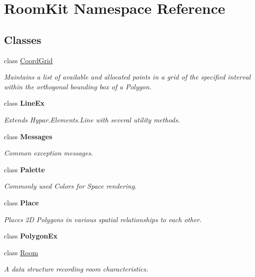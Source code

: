 \hypertarget{namespace_room_kit}{}\section{Room\+Kit Namespace Reference}
\label{namespace_room_kit}
\subsection*{Classes}
\begin{DoxyCompactItemize}
\item 
class \mbox{\hyperlink{class_room_kit_1_1_coord_grid}{Coord\+Grid}}
\begin{DoxyCompactList}\small\item\em Maintains a list of available and allocated points in a grid of the specified interval within the orthogonal bounding box of a Polygon. \end{DoxyCompactList}\item 
class {\bfseries Line\+Ex}
\begin{DoxyCompactList}\small\item\em Extends Hypar.\+Elements.\+Line with several utility methods. \end{DoxyCompactList}\item 
class {\bfseries Messages}
\begin{DoxyCompactList}\small\item\em Common exception messages. \end{DoxyCompactList}\item 
class {\bfseries Palette}
\begin{DoxyCompactList}\small\item\em Commonly used Colors for Space rendering. \end{DoxyCompactList}\item 
class {\bfseries Place}
\begin{DoxyCompactList}\small\item\em Places 2D Polygons in various spatial relationships to each other. \end{DoxyCompactList}\item 
class {\bfseries Polygon\+Ex}
\item 
class \mbox{\hyperlink{class_room_kit_1_1_room}{Room}}
\begin{DoxyCompactList}\small\item\em A data structure recording room characteristics. \end{DoxyCompactList}\item 

\end{DoxyCompactItemize}
